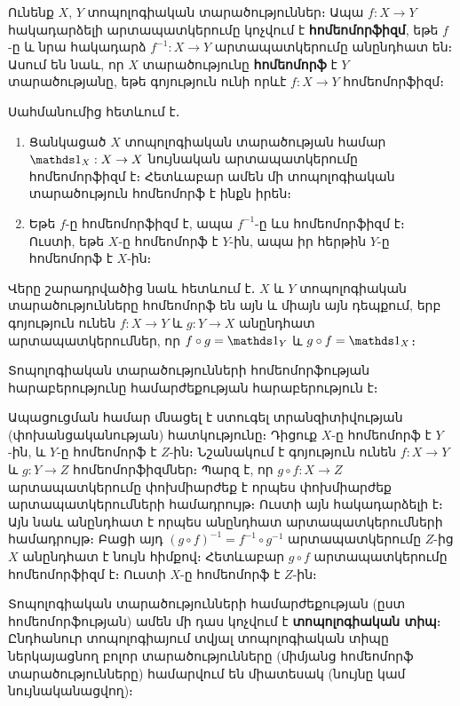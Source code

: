 \documentclass[./main.tex]{subfiles}
\begin{document}
\begin{definition}
Ունենք $X$, $Y$ տոպոլոգիական տարածություններ։ Ապա $f:X\rightarrow Y$ հա\-կա\-դար\-ձելի արտապատկերումը կոչվում է \textbf{հոմեոմորֆիզմ}, եթե $f$-ը և նրա հա\-կա\-դարձ $f^{-1}:X\rightarrow Y$ արտապատկերումը անընդհատ են։ Ասում են նաև, որ $X$ տարածությունը \textbf{հոմեոմորֆ} է $Y$ տարածությանը, եթե գոյություն ունի որևէ ${f:X\rightarrow Y}$ հոմեոմորֆիզմ։ 
\end{definition}
Սահմանումից հետևում է․
\begin{enumerate}
    \item [1)] Ցանկացած $X$ տոպոլոգիական տարածության համար $\nuynakan_X:X\rightarrow X$ նույնական արտապատկերումը հոմեոմորֆիզմ է։ Հետևաբար ամեն մի տոպոլոգիական տարածություն հոմեոմորֆ է ինքն իրեն։
    \item [2)] Եթե $f$-ը հոմեոմորֆիզմ է, ապա $f^{-1}$-ը ևս հոմեոմորֆիզմ է։\\Ուստի, եթե $X$-ը հոմեոմորֆ է $Y$-ին, ապա իր հերթին $Y$-ը հոմեոմորֆ է $X$-ին։
\end{enumerate}
\par Վերը շարադրվածից նաև հետևում է․ $X$ և $Y$ տոպոլոգիական տարածություննե\-րը հոմեոմորֆ են այն և միայն այն դեպքում, երբ գոյություն ունեն $f:X\rightarrow Y$ և $g:Y\rightarrow X$ անընդհատ արտապատկերումներ, որ $f\circ g=\nuynakan_Y$ և $g\circ f=\nuynakan_X$։
\begin{theorem}\label{ch9thm7} 
Տոպոլոգիական տարածությունների հոմեոմորֆության հա\-րա\-բե\-րու\-թյունը համարժեքության հարաբերություն է։ 
\end{theorem}

\begin{varproof}
Ապացուցման համար մնացել է ստուգել տրան\-զի\-տի\-վութ\-յան (փոխանցականու\-թյան) հատկությունը։ Դիցուք $X$-ը հոմեոմորֆ է $Y$-ին, և $Y$-ը հոմեոմորֆ է $Z$-ին։ Նշանակում է գոյություն ունեն $f:X\rightarrow Y$ և $g:Y\rightarrow Z$ հոմեոմորֆիզմներ։ Պարզ է, որ $g\circ f:X\rightarrow Z$ արտապատկերումը փոխմիարժեք է որպես փոխմիարժեք ար\-տա\-պատկերումների համադրույթ։ Ուստի այն հակադարձելի է։ Այն նաև անընդ\-հատ է որպես անընդհատ արտապատկերում\-ների համադրույթ։ Բացի այդ $(g\circ f)^{-1}=f^{-1}\circ g^{-1}$ արտապատկերումը $Z$-ից $X$ անընդհատ է նույն հիմքով։ Հետևաբար $g\circ f$ արտապատկերումը հոմեոմորֆիզմ է։ Ուստի $X$-ը հոմեոմորֆ է $Z$-ին։ \end{varproof}

\par Տոպոլոգիական տարածությունների համարժեքության (ըստ հոմեոմորֆության) ամեն մի դաս կոչվում է \textbf{տոպոլոգիական տիպ}։ Ընդհանուր տոպոլոգիայում տվյալ տոպոլոգիական տիպը ներկայացնող բոլոր տարածությունները (միմյանց հոմեո\-մորֆ տարածությունները) համարվում են միատեսակ (նույնը կամ նույնականաց\-վող)։
\end{document}
